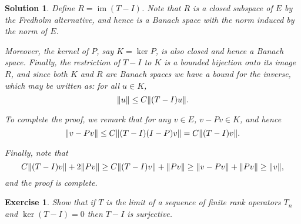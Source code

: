 \documentclass{article}
\newtheorem{ex}{Exercise}
\theoremstyle{nonumberplain}
\newtheorem{sol}{Solution}
\DeclareMathOperator{\image}{im}
\DeclarePairedDelimiter{\Norm}{\lVert}{\rVert}
\begin{document}
\begin{sol}
Define $R = \image(T-I)$. Note that $R$ is a closed subspace of $E$ by the Fredholm alternative, and hence is a Banach space with the norm induced by the norm of $E$.

Moreover, the kernel of $P$, say $K = \ker P$, is also closed and hence a Banach space. Finally, the restriction of $T-I$ to $K$ is a bounded bijection onto its image $R$, and since both $K$ and $R$ are Banach spaces we have a bound for the inverse, which may be written as: for all $u \in K$,
\begin{equation}
\Norm{u} \leq C \Norm{(T-I)u}.
\end{equation}

To complete the proof, we remark that for any $v \in E$, $v - Pv \in K$, and hence
\begin{equation}
\Norm{v - Pv} \leq C \Norm{(T-I)(I-P)v} = C \Norm{(T-I)v}.
\end{equation}

Finally, note that
\begin{equation}
C \Norm{(T-I)v} + 2 \Norm{Pv} \geq C \Norm{(T-I)v} + \Norm{Pv} \geq \Norm{v - Pv} + \Norm{Pv} \geq \Norm{v},
\end{equation}
and the proof is complete.
\end{sol}

\setcounter{ex}{1}
\begin{ex}
Show that if $T$ is the limit of a sequence of finite rank operators $T_n$ and $\ker(T-I) = 0$ then $T-I$ is surjective.
\end{ex}
\end{document}
